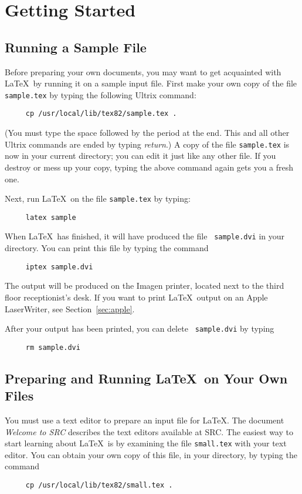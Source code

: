 \section{Getting Started}

\subsection{Running a Sample File} \label{sec:sample}

Before preparing your own documents, you may want to get acquainted
with \LaTeX\ by running it on a sample input file.  First make your own
copy of the file \mbox{\tt sample.tex} by typing the following
Ultrix command:
\begin{verbatim}
     cp /usr/local/lib/tex82/sample.tex .
\end{verbatim}
(You must type the space followed by the period at the end.  This
and all other Ultrix commands are ended by typing {\em return}.)
A copy of the file \mbox{\tt sample.tex} is now in your current
directory; you can edit it just like any other file.  If you destroy or
mess up your copy, typing the above command again gets you a fresh
one.

Next, run \LaTeX\ on the file \mbox{\tt sample.tex} by typing:
\begin{verbatim}
     latex sample
\end{verbatim}
When \LaTeX\ has finished, it will have produced the file \mbox{\tt
sample.dvi} in your directory.  You can print this file by typing the
command
\begin{verbatim}
     iptex sample.dvi
\end{verbatim}
The output will be produced on the Imagen printer, located next to the
third floor receptionist's desk.  If you want to print \LaTeX\ output
on an Apple LaserWriter, see Section~\ref{sec:apple}.

After your output has been printed, you can delete \mbox{\tt
sample.dvi} by typing
\begin{verbatim}
     rm sample.dvi
\end{verbatim}

\subsection{Preparing and Running \LaTeX\ on Your Own Files}

You must use a text editor to prepare an input file for \LaTeX. The
document {\em Welcome to SRC\/} describes the text editors available
at SRC.  The easiest way to start learning about \LaTeX\ is by 
examining the file \mbox{\tt small.tex} with your text editor.
You can obtain your own copy of this file, in your directory,
by typing the command
\begin{verbatim}
     cp /usr/local/lib/tex82/small.tex .
\end{verbatim}

